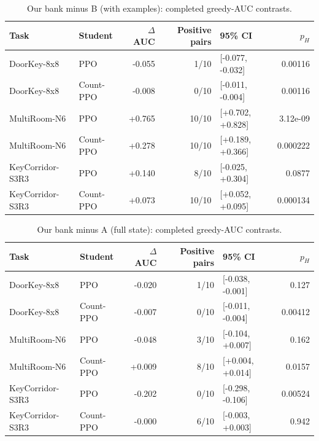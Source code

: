 \begin{table}[htbp]\centering\small

\caption{Our bank minus B (with examples): completed greedy-AUC contrasts.}

\begin{tabular}{@{}llrrlr@{}}\toprule

Task & Student & $\Delta$AUC & Positive pairs & 95\% CI & $p_H$\\\midrule

DoorKey-8x8 & PPO & -0.055 & 1/10 & [-0.077, -0.032] & 0.00116\\

DoorKey-8x8 & Count-PPO & -0.008 & 0/10 & [-0.011, -0.004] & 0.00116\\

MultiRoom-N6 & PPO & +0.765 & 10/10 & [+0.702, +0.828] & 3.12e-09\\

MultiRoom-N6 & Count-PPO & +0.278 & 10/10 & [+0.189, +0.366] & 0.000222\\

KeyCorridor-S3R3 & PPO & +0.140 & 8/10 & [-0.025, +0.304] & 0.0877\\

KeyCorridor-S3R3 & Count-PPO & +0.073 & 10/10 & [+0.052, +0.095] & 0.000134\\

\bottomrule\end{tabular}\end{table}

\begin{table}[htbp]\centering\small

\caption{Our bank minus A (full state): completed greedy-AUC contrasts.}

\begin{tabular}{@{}llrrlr@{}}\toprule

Task & Student & $\Delta$AUC & Positive pairs & 95\% CI & $p_H$\\\midrule

DoorKey-8x8 & PPO & -0.020 & 1/10 & [-0.038, -0.001] & 0.127\\

DoorKey-8x8 & Count-PPO & -0.007 & 0/10 & [-0.011, -0.004] & 0.00412\\

MultiRoom-N6 & PPO & -0.048 & 3/10 & [-0.104, +0.007] & 0.162\\

MultiRoom-N6 & Count-PPO & +0.009 & 8/10 & [+0.004, +0.014] & 0.0157\\

KeyCorridor-S3R3 & PPO & -0.202 & 0/10 & [-0.298, -0.106] & 0.00524\\

KeyCorridor-S3R3 & Count-PPO & -0.000 & 6/10 & [-0.003, +0.003] & 0.942\\

\bottomrule\end{tabular}\end{table}

